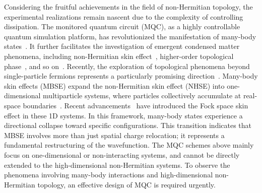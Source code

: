 \documentclass[longbibliography, aps, prx, amsmath, amssymb, amsfonts, twocolumn,superscriptaddress, footinbib]{revtex4-1}
\begin{document}
	Considering the fruitful achievements in the field of non-Hermitian topology, the experimental realizations remain nascent due to the complexity of controlling dissipation.
    The monitored quantum circuit (MQC), as a highly controllable quantum simulation platform, has revolutionized the manifestation of many-body states~\cite{skinner2019measurement,nahum2017quantum,gullans2020dynamical,koh2023measurement,li2023cross,choi2020quantum,minato2022fate,yang2025bridging,potter2022entanglement,iqbal2024non,zhang2025physics}. 
	{It further facilitates the investigation of emergent condensed matter phenomena}, including non-Hermitian skin effect~\cite{fleckenstein2022non}, higher-order topological phase~\cite{koh2024realization}, and so on~\cite{iqbal2024non}. 
	Recently, the exploration of topological phenomena beyond single-particle fermions represents a particularly promising direction~\cite{deng2022observing, zhao2025}.
	{
		Many-body skin effects (MBSE) expand the non-Hermitian skin effect (NHSE) into one-dimensional multiparticle systems, where particles collectively accumulate at real-space boundaries~\cite{shen2025observation}. Recent advancements~\cite{shen2024enhanced,shimomura2024general} have introduced the Fock space skin effect in these 1D systems. In this framework, many-body states experience a directional collapse toward specific configurations. This transition indicates that MBSE involves more than just spatial charge relocation; it represents a fundamental restructuring of the wavefunction.
	}
	The MQC schemes above mainly focus on one-dimensional or non-interacting systems, and cannot be directly extended to the high-dimensional non-Hermitian systems. To observe the phenomena involving many-body interactions and high-dimensional non-Hermitian topology, an effective design of MQC is required urgently.
\end{document}
